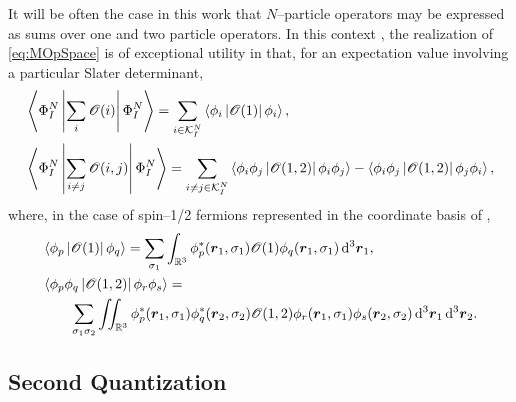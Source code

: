 It will be often the case in this work that $N$--particle operators may be expressed as sums over one and
two particle operators. In this context , the realization of \cref{eq:MOpSpace} is of exceptional utility in that,
for an expectation value involving a particular Slater determinant,
\begin{subequations}
  \label{eq:SlaterCondon}
\begin{align}
  &\left\langle \Phi^N_I \left\vert \sum_i\mathscr{O}(i) \right\vert \Phi^N_I \right\rangle = \sum_{i\in\mathcal{K}^N_I} \left\langle \phi_i \left\vert \mathscr{O}(1) \right\vert \phi_i \right\rangle,\\
  &\left\langle \Phi^N_I \left\vert \sum_{i\neq j} \mathscr{O}(i,j) \right\vert \Phi^N_I \right\rangle = 
    \sum_{i\neq j \in\mathcal{K}^N_I} 
      \left\langle \phi_i \phi_j  \left\vert \mathscr{O}(1,2) \right\vert \phi_i \phi_j \right\rangle - 
      \left\langle \phi_i \phi_j  \left\vert \mathscr{O}(1,2) \right\vert \phi_j \phi_i \right\rangle,
\end{align}
\end{subequations}
where, in the case of spin--1/2 fermions represented in the coordinate basis of ,
\begin{subequations}
  \label{eq:DiracInts}
\begin{align}
  &\left\langle \phi_p \left\vert \mathscr{O}(1) \right\vert \phi_q \right\rangle = 
    \sum_{\sigma_1} \int_{\mathbb{R}^3} \phi_p^*(\boldsymbol{r}_1,\sigma_1) \mathscr{O}(1) \phi_q(\boldsymbol{r}_1,\sigma_1) \,\mathrm{d}^3 \boldsymbol{r}_1,\\
  &\left\langle \phi_p \phi_q  \left\vert \mathscr{O}(1,2) \right\vert \phi_r \phi_s \right\rangle = \nonumber \\ &\qquad
    \sum_{\sigma_1 \sigma_2} \int\mkern-9mu\int_{\mathbb{R}^3} 
      \phi_p^*(\boldsymbol{r}_1,\sigma_1) \phi_q^*(\boldsymbol{r}_2,\sigma_2) \mathscr{O}(1,2) 
      \phi_r(\boldsymbol{r}_1,\sigma_1) \phi_s(\boldsymbol{r}_2,\sigma_2) \,\mathrm{d}^3 \boldsymbol{r}_1 \,\mathrm{d}^3 \boldsymbol{r}_2.
\end{align}
\end{subequations}


\subsection{Second Quantization}
\label{sec:SQ}

